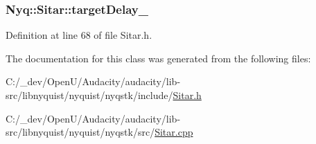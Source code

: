 \subsubsection[{\texorpdfstring{target\+Delay\+\_\+}{targetDelay_}}]{ Nyq\+::\+Sitar\+::target\+Delay\+\_\+\hspace{0.3cm}{\ttfamily [protected]}}\hypertarget{class_nyq_1_1_sitar_ac60d88700b8e542affd3b9a106d2ce5a}{}\label{class_nyq_1_1_sitar_ac60d88700b8e542affd3b9a106d2ce5a}


Definition at line 68 of file Sitar.\+h.



The documentation for this class was generated from the following files\+:\begin{DoxyCompactItemize}
\item 
C\+:/\+\_\+dev/\+Open\+U/\+Audacity/audacity/lib-\/src/libnyquist/nyquist/nyqstk/include/\hyperlink{_sitar_8h}{Sitar.\+h}\item 
C\+:/\+\_\+dev/\+Open\+U/\+Audacity/audacity/lib-\/src/libnyquist/nyquist/nyqstk/src/\hyperlink{_sitar_8cpp}{Sitar.\+cpp}\end{DoxyCompactItemize}
